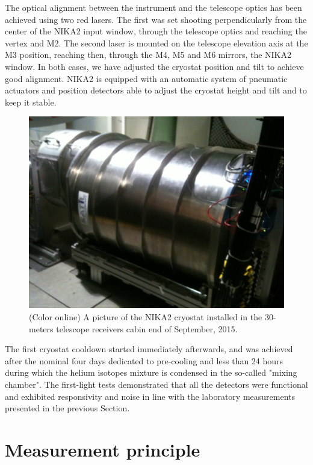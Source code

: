 \documentclass[]{aa} %
\begin{document}
The optical alignment between the instrument and the telescope optics has been achieved using two red lasers. The first was set shooting perpendicularly from the center of the NIKA2 input window, through the telescope optics and reaching the vertex and M2. The second laser is mounted on the telescope elevation axis at the M3 position, reaching then, through the M4, M5 and M6 mirrors, the NIKA2 window. In both cases, we have adjusted the cryostat position and tilt to achieve good alignment. NIKA2 is equipped with an automatic system of pneumatic actuators and position detectors able to adjust the cryostat height and tilt and to keep it stable. 

\begin{figure}[h]
   \centering
    \includegraphics[width=.85\linewidth]{NIKA2cryo.jpg}
      \caption{(Color online) A picture of the NIKA2 cryostat installed in the 30-meters telescope receivers cabin end of September, 2015.}
         \label{Fig5}
\end{figure}

The first cryostat cooldown started immediately afterwards, and was achieved after the nominal four days dedicated to pre-cooling and less than 24 hours during which the helium isotopes mixture is condensed in the so-called "mixing chamber". The first-light tests demonstrated that all the detectors were functional and exhibited responsivity and noise in line with the laboratory measurements presented in the previous Section. 






\section{Measurement principle}
\label{Measurement principle}
\end{document}
